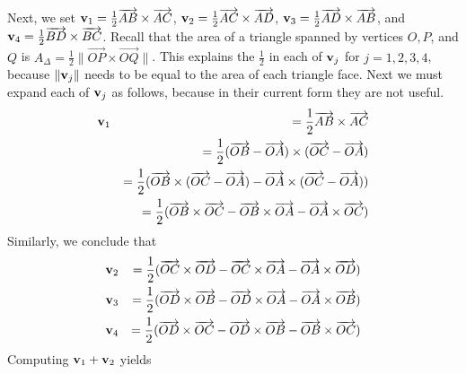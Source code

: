 \documentclass[12pt]{amsbook}
\begin{document}
\\
Next, we set ${\bf v}_1=\frac 12\overrightarrow{AB}\times\overrightarrow{AC}$, ${\bf v}_2=\frac 12\overrightarrow{AC}\times\overrightarrow{AD}$, ${\bf v}_3=\frac 12\overrightarrow{AD}\times\overrightarrow{AB}$, and ${\bf v}_4=\frac 12\overrightarrow{BD}\times\overrightarrow{BC}$. Recall that the area of a triangle spanned by vertices $O,P$, and $Q$ is $A_\Delta=\frac 12\|\overrightarrow{OP}\times\overrightarrow{OQ}\|$. This explains the $\frac 12$ in each of ${\bf v}_j$ for $j=1,2,3,4$, because $\|{\bf v}_j\|$ needs to be equal to the area of each triangle face. Next we must expand each of ${\bf v}_j$ as follows, because in their current form they are not useful.
\begin{eqnarray*}
{\bf v}_1&&=\frac 12\overrightarrow{AB}\times\overrightarrow{AC} \\
&&=\frac 12(\overrightarrow{OB}-\overrightarrow{OA})\times(\overrightarrow{OC}-\overrightarrow{OA}) \\
&&=\frac 12(\overrightarrow{OB}\times(\overrightarrow{OC}-\overrightarrow{OA})-\overrightarrow{OA}\times(\overrightarrow{OC}-\overrightarrow{OA})) \\
&&=\frac 12(\overrightarrow{OB}\times\overrightarrow{OC}-\overrightarrow{OB}\times\overrightarrow{OA}-\overrightarrow{OA}\times\overrightarrow{OC}) 
\end{eqnarray*}
Similarly, we conclude that 
\begin{eqnarray*}
{\bf v}_2&&=\frac 12(\overrightarrow{OC}\times\overrightarrow{OD}-\overrightarrow{OC}\times\overrightarrow{OA}-\overrightarrow{OA}\times\overrightarrow{OD}) \\
{\bf v}_3&&=\frac 12(\overrightarrow{OD}\times\overrightarrow{OB}-\overrightarrow{OD}\times\overrightarrow{OA}-\overrightarrow{OA}\times\overrightarrow{OB})  \\
{\bf v}_4&&=\frac 12(\overrightarrow{OD}\times\overrightarrow{OC}-\overrightarrow{OD}\times\overrightarrow{OB}-\overrightarrow{OB}\times\overrightarrow{OC}) 
\end{eqnarray*}
Computing ${\bf v}_1+{\bf v}_2$ yields
\end{document}
